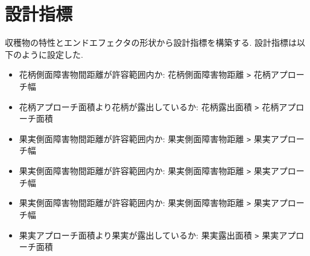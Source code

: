 \section{設計指標}
収穫物の特性とエンドエフェクタの形状から設計指標を構築する.
設計指標は以下のように設定した.

\begin{itemize}
  \item 花柄側面障害物間距離が許容範囲内か: 花柄側面障害物距離 \verb|>| 花柄アプローチ幅
  \item 花柄アプローチ面積より花柄が露出しているか: 花柄露出面積 \verb|>| 花柄アプローチ面積
  \item 果実側面障害物間距離が許容範囲内か: 果実側面障害物距離 \verb|>| 果実アプローチ幅
  \item 果実側面障害物間距離が許容範囲内か: 果実側面障害物距離 \verb|>| 果実アプローチ幅
  \item 果実側面障害物間距離が許容範囲内か: 果実側面障害物距離 \verb|>| 果実アプローチ幅
  \item 果実アプローチ面積より果実が露出しているか: 果実露出面積 \verb|>| 果実アプローチ面積
\end{itemize}

